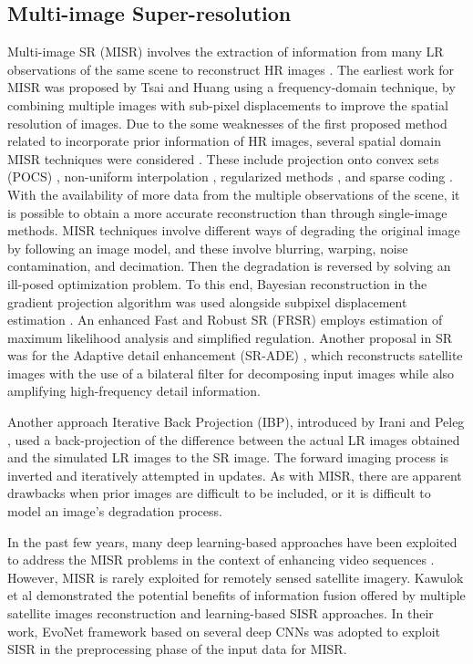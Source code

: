 \documentclass[journal]{IEEEtran}
\begin{document}
\subsection{Multi-image Super-resolution}
Multi-image SR (MISR) involves the extraction of information from many LR observations of the same scene to reconstruct HR images \cite{yue2016image}. The earliest work for MISR was proposed by Tsai and Huang \cite{tsai1984multiframe} using a frequency-domain technique, by combining multiple images with sub-pixel displacements to improve the spatial resolution of images. Due to the some weaknesses of the first proposed method related to incorporate prior information of HR images, several spatial domain MISR techniques were considered \cite{elad2001fast}. These include projection onto convex sets (POCS) \cite{stark1989high}, non-uniform interpolation \cite{lertrattanapanich2002high}, regularized methods \cite{takeda2007kernel,shen2009super}, and sparse coding \cite{kato2017double}. With the availability of more data from the multiple observations of the scene, it is possible to obtain a more accurate reconstruction than through single-image methods. MISR techniques involve different ways of degrading the original image by following an image model, and these involve blurring, warping, noise contamination, and decimation. Then the degradation is reversed by solving an ill-posed optimization problem. To this end, Bayesian reconstruction in the gradient projection algorithm was used alongside subpixel displacement estimation \cite{schultz1996extraction}. An enhanced Fast and Robust SR (FRSR) \cite{farsiu2004fast} employs estimation of maximum likelihood analysis and simplified regulation. Another proposal in SR was for the Adaptive detail enhancement (SR-ADE) \cite{arbelaez2010contour}, which reconstructs satellite images with the use of a bilateral filter for decomposing input images while also amplifying high-frequency detail information. 

Another approach Iterative Back Projection (IBP), introduced by Irani and Peleg \cite{irani1991improving}, used a back-projection of the difference between the actual LR images obtained and the simulated LR images to the SR image. The forward imaging process is inverted and iteratively attempted in updates. As with MISR, there are apparent drawbacks when prior images are difficult to be included, or it is difficult to model an image's degradation process.

In the past few years, many deep learning-based approaches have been exploited to address the MISR problems in the context of enhancing video sequences \cite{kappeler2016video,caballero2017real,jo2018deep}. However, MISR is rarely exploited for remotely sensed satellite imagery. Kawulok et al \cite{kawulok2019deep} demonstrated the potential benefits of information fusion offered by multiple satellite images reconstruction and learning-based SISR approaches. In their work, EvoNet framework \cite{kawulok2018evolving} based on several deep CNNs was adopted to exploit SISR in the preprocessing phase of the input data for MISR. 
\end{document}
